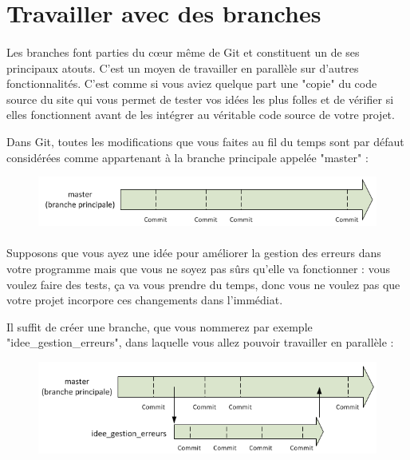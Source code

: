 \documentclass[french, a4paper, 12pt, titlepage]{article}
\begin{document}
\section{Travailler avec des branches}
\paragraph{}Les branches font parties du cœur même de Git et constituent un de ses principaux atouts. C’est un moyen de travailler en parallèle sur d’autres fonctionnalités. C’est comme si vous aviez quelque part une "copie" du code source du site qui vous permet de tester vos idées les plus folles et de vérifier si elles fonctionnent avant de les intégrer au véritable code source de votre projet.

Dans Git, toutes les modifications que vous faites au fil du temps sont par défaut considérées comme appartenant à la branche principale appelée "master" :

\begin{figure}[h]
\includegraphics[width=\textwidth]{Branch1}
\end{figure}

\paragraph{}Supposons que vous ayez une idée pour améliorer la gestion des erreurs dans votre programme mais que vous ne soyez pas sûrs qu’elle va fonctionner : vous voulez faire des tests, ça va vous prendre du temps, donc vous ne voulez pas que votre projet incorpore ces changements dans l’immédiat.

Il suffit de créer une branche, que vous nommerez par exemple "idee\_gestion\_erreurs", dans laquelle vous allez pouvoir travailler en parallèle :

\begin{figure}[h]
\includegraphics[width=\textwidth]{Branch2}
\end{figure}
\end{document}
